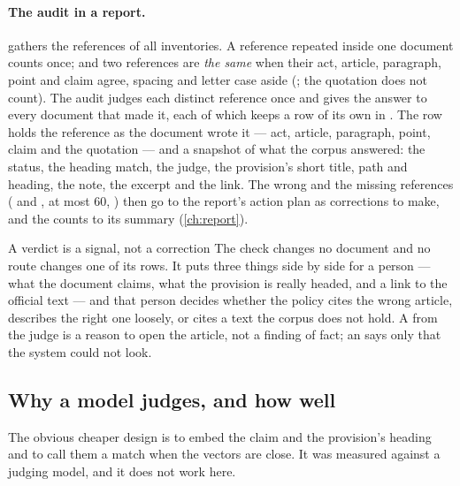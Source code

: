 \paragraph{The audit in a report.}  gathers the references of all
inventories. A reference repeated inside one document counts once; and two references are
\emph{the same} when their act, article, paragraph, point and claim agree, spacing and letter
case aside (; the quotation does not count). The audit judges each
distinct reference once and gives the answer to every document that made it, each of which
keeps a row of its own in . The row holds the reference as the
document wrote it --- act, article, paragraph, point, claim and the quotation --- and a
snapshot of what the corpus answered: the status, the heading match, the judge, the
provision's short title, path and heading, the note, the excerpt and the link. The wrong and
the missing references ( and , at most 60,
) then go to the report's action plan as corrections to make, and
the counts to its summary (\cref{ch:report}).

\begin{humanbox}{A verdict is a signal, not a correction}
The check changes no document and no route changes one of its rows. It puts three things side
by side for a person --- what the document claims, what the provision is really headed, and a
link to the official text --- and that person decides whether the policy cites the wrong
article, describes the right one loosely, or cites a text the corpus does not hold. A
 from the judge is a reason to open the article, not a finding of fact; an
 says only that the system could not look.
\end{humanbox}

\subsection{Why a model judges, and how well}\label{sec:company:measured}

The obvious cheaper design is to embed the claim and the provision's heading and to call them
a match when the vectors are close. It was measured against a judging model, and it does not
work here.

